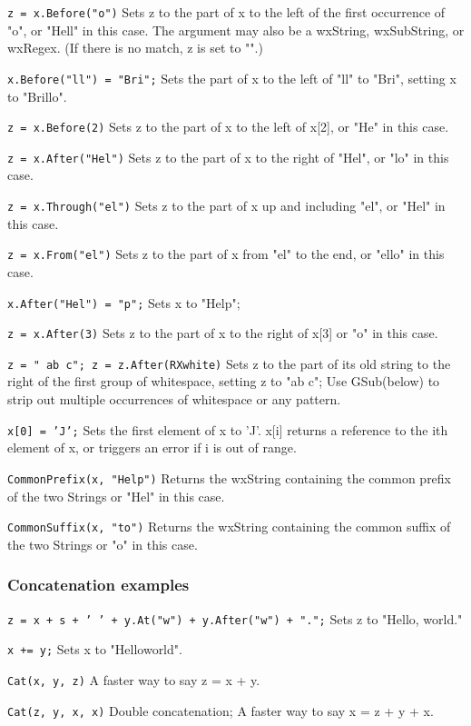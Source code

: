 {\tt z = x.Before("o")} 
Sets z to the part of x to the left of the first occurrence of
"o", or "Hell" in this case. The argument may also be a wxString,
wxSubString, or wxRegex.  (If there is no match, z is set to "".)

{\tt x.Before("ll") = "Bri";} 
Sets the part of x to the left of "ll" to "Bri", setting x to
"Brillo".

{\tt z = x.Before(2)} 
Sets z to the part of x to the left of x[2], or "He" in this case.

{\tt z = x.After("Hel")} 
Sets z to the part of x to the right of "Hel", or "lo" in this
case.

{\tt z = x.Through("el")} 
Sets z to the part of x up and including "el", or "Hel" in this
case.

{\tt z = x.From("el")} 
Sets z to the part of x from "el" to the end, or "ello" in this
case.

{\tt x.After("Hel") = "p";} 
Sets x to "Help";

{\tt z = x.After(3)} 
Sets z to the part of x to the right of x[3] or "o" in this case.

{\tt z = "  ab c"; z = z.After(RXwhite)} 
Sets z to the part of its old string to the right of the first
group of whitespace, setting z to "ab c"; Use GSub(below) to strip
out multiple occurrences of whitespace or any pattern.

{\tt x[0] = 'J';} 
Sets the first element of x to 'J'. x[i] returns a reference to
the ith element of x, or triggers an error if i is out of range.

{\tt CommonPrefix(x, "Help")} 
Returns the wxString containing the common prefix of the two Strings
or "Hel" in this case.

{\tt CommonSuffix(x, "to")} 
Returns the wxString containing the common suffix of the two Strings
or "o" in this case.

\subsubsection{Concatenation examples}

{\tt z = x + s + ' ' + y.At("w") + y.After("w") + ".";} 
Sets z to "Hello, world."

{\tt x += y;} 
Sets x to "Helloworld".

{\tt Cat(x, y, z)} 
A faster way to say z = x + y.

{\tt Cat(z, y, x, x)} 
Double concatenation; A faster way to say x = z + y + x.


